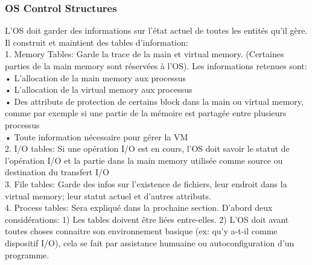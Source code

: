\subsubsection{OS Control Structures}
L’OS doit garder des informations sur l’état actuel de toutes les entités qu’il gère. Il construit et maintient des tables d’information: \\
1. Memory Tables: Garde la trace de la main et virtual memory. (Certaines parties de la main memory sont réservées à l’OS). Les informations retenues sont: \\
• L’allocation de la main memory aux processus \\
• L’allocation de la virtual memory aux processus \\
• Des attributs de protection de certains block dans la main ou virtual memory, comme par exemple si une partie de la mémoire est partagée entre plusieurs processus \\
• Toute information nécessaire pour gérer la VM \\
2. I/O tables: Si une opération I/O est en cours, l’OS doit savoir le statut de l’opération I/O et la partie dans la main memory utilisée comme source ou destination du transfert I/O \\
3. File tables: Garde des infos sur l’existence de fichiers, leur endroit dans la virtual memory; leur statut actuel et d’autres attributs. \\
4. Process tables: Sera expliqué dans la prochaine section. D’abord deux considérations: 1) Les tables doivent être liées entre-elles. 2) L’OS doit avant toutes choses connaitre son environnement basique (ex: qu’y a-t-il comme dispositif I/O), cela se fait par assistance humuaine ou autoconfiguration d’un programme.

